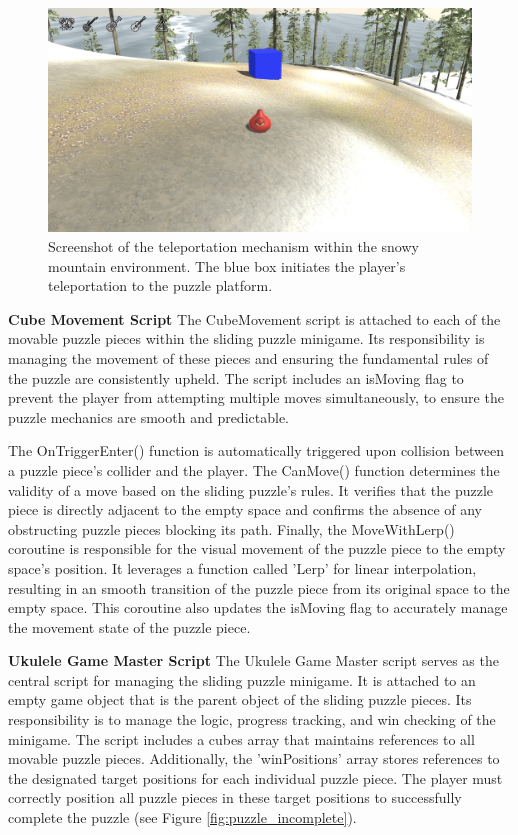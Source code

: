 \documentclass{l4proj}
\begin{document}
\begin{figure}[h]
  \centering
  \includegraphics[width=0.7\linewidth]{dissertation/images/Sliding_Teleport.png} 
  \caption{Screenshot of the teleportation mechanism within the snowy mountain environment. The blue box initiates the player's teleportation to the puzzle platform.} 
  \label{fig:teleportation} 
\end{figure}

\textbf{Cube Movement Script} \newline
The CubeMovement script is attached to each of the movable puzzle pieces within the sliding puzzle minigame. Its responsibility is managing the movement of these pieces and ensuring the fundamental rules of the puzzle are consistently upheld. The script includes an isMoving flag to prevent the player from attempting multiple moves simultaneously, to ensure the puzzle mechanics are smooth and predictable.

The OnTriggerEnter() function is automatically triggered upon collision between a puzzle piece's collider and the player. The CanMove() function determines the validity of a move based on the sliding puzzle's rules. It verifies that the puzzle piece is directly adjacent to the empty space and confirms the absence of any obstructing puzzle pieces blocking its path. Finally, the MoveWithLerp() coroutine is responsible for the visual movement of the puzzle piece to the empty space's position. It leverages a function called 'Lerp' for linear interpolation, resulting in an smooth transition of the puzzle piece from its original space to the empty space. This coroutine also updates the isMoving flag to accurately manage the movement state of the puzzle piece.

\textbf{Ukulele Game Master Script} \newline
The Ukulele Game Master script serves as the central script for managing the sliding puzzle minigame. It is attached to an empty game object that is the parent object of the sliding puzzle pieces. Its responsibility is to manage the logic, progress tracking, and win checking of the minigame. The script includes a cubes array that maintains references to all movable puzzle pieces. Additionally, the 'winPositions' array stores references to the designated target positions for each individual puzzle piece.  The player must correctly position all puzzle pieces in these target positions to successfully complete the puzzle (see Figure \ref{fig:puzzle_incomplete}).
\end{document}
